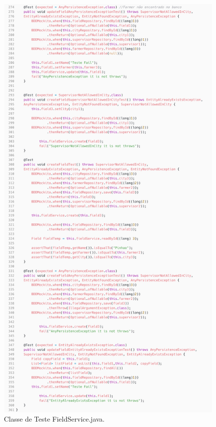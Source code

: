 \begin{itemize}
\begin{figure}[H]
	\centering
	\includegraphics[scale=0.13]{dados/figuras/carbonFieldService3.png}
	\caption{Classe de Teste  FieldService.java.}
	\label{testeFieldService}
\end{figure}


\end{itemize}
